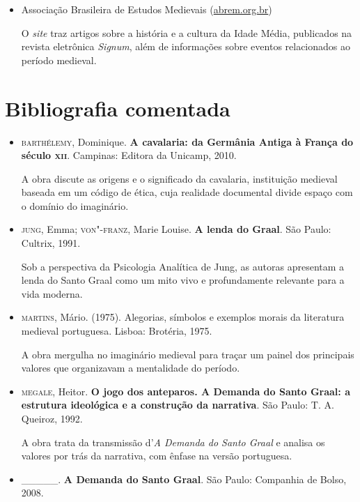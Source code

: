 \documentclass[11pt]{extarticle}
\begin{document}
\begin{itemize}
\item Associação Brasileira de Estudos Medievais
(\href{http://www.abrem.org.br}{abrem.org.br})

  O \emph{site} traz artigos sobre a história e a cultura da Idade
  Média, publicados na revista eletrônica \emph{Signum}, além de
  informações sobre eventos relacionados ao período medieval.
\end{itemize}

\section{Bibliografia comentada}


\begin{itemize}
\item\textsc{barthélemy}, Dominique. \textbf{A cavalaria: da Germânia Antiga à França do século \textsc{xii}}. Campinas: Editora da Unicamp, 2010.

  A obra discute as origens e o significado da cavalaria, instituição
  medieval baseada em um código de ética, cuja realidade documental
  divide espaço com o domínio do imaginário.

\item\textsc{jung}, Emma; \textsc{von"-franz}, Marie Louise. \textbf{A lenda do Graal}. São
Paulo: Cultrix, 1991.

  Sob a perspectiva da Psicologia Analítica de Jung, as autoras
  apresentam a lenda do Santo Graal como um mito vivo e profundamente
  relevante para a vida moderna.

\item\textsc{martins}, Mário. (1975). Alegorias, símbolos e exemplos morais da
literatura medieval portuguesa. Lisboa: Brotéria, 1975.

  A obra mergulha no imaginário medieval para traçar um painel dos
  principais valores que organizavam a mentalidade do período.

\item\textsc{megale}, Heitor. \textbf{O jogo dos anteparos. A Demanda do Santo Graal: a estrutura ideológica e a construção da narrativa}. São Paulo: T. A.
Queiroz, 1992.

  A obra trata da transmissão d'\emph{A Demanda do Santo Graal} e
  analisa os valores por trás da narrativa, com ênfase na versão
  portuguesa.

\item\_\_\_\_\_. \textbf{A Demanda do Santo Graal}. São Paulo: Companhia de
Bolso, 2008.


\end{itemize}
\end{document}
